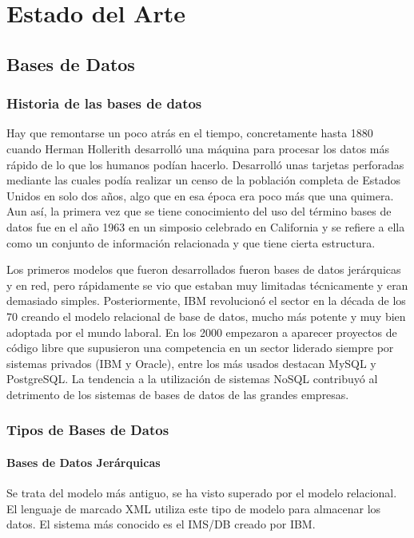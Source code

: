 \chapter{Estado del Arte}

\section{Bases de Datos}
\subsection{Historia de las bases de datos}

Hay que remontarse un poco atrás en el tiempo, concretamente hasta 1880 cuando Herman Hollerith desarrolló una máquina para procesar los datos más rápido de lo que los humanos podían hacerlo. Desarrolló unas tarjetas perforadas mediante las cuales podía realizar un censo de la población completa de Estados Unidos en solo dos años, algo que en esa época era poco más que una quimera. Aun así, la primera vez que se tiene conocimiento del uso del término bases de datos fue en el año 1963 en un simposio celebrado en California y se refiere a ella como un conjunto de información relacionada y que tiene cierta estructura.

Los primeros modelos que fueron desarrollados fueron bases de datos jerárquicas y en red, pero rápidamente se vio que estaban muy limitadas técnicamente y eran demasiado simples. Posteriormente, IBM revolucionó el sector en la década de los 70 creando el modelo relacional de base de datos, mucho más potente y muy bien adoptada por el mundo laboral.
En los 2000 empezaron a aparecer proyectos de código libre que supusieron una competencia en un sector liderado siempre por sistemas privados (IBM y Oracle), entre los más usados destacan MySQL y PostgreSQL. La tendencia a la utilización de sistemas NoSQL contribuyó al detrimento de los sistemas de bases de datos de las grandes empresas. \cite{sanchez2016historia} 

\subsection{Tipos de Bases de Datos}
\subsubsection{Bases de Datos Jerárquicas}

Se trata del modelo más antiguo, se ha visto superado por el modelo relacional. El lenguaje de marcado XML utiliza este tipo de modelo para almacenar los datos. El sistema más conocido es el IMS/DB creado por IBM.

